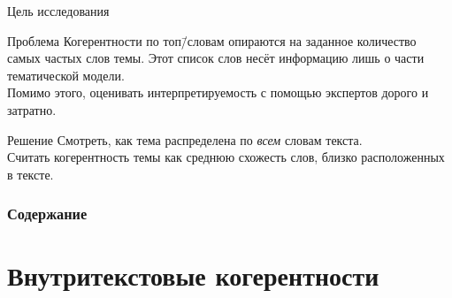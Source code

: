 \documentclass[russian]{beamer}
\begin{document}
\begin{frame}{Цель исследования}
  \begin{block}{Проблема}
    Когерентности по топ\=/словам опираются на заданное количество самых частых слов темы.
    Этот список слов несёт информацию лишь о части тематической модели.\\
    Помимо этого, оценивать интерпретируемость с помощью экспертов дорого и затратно.
  \end{block}
  \begin{block}{Решение}
    Смотреть, как тема распределена по \emph{всем} словам текста.\\
    Считать когерентность темы как среднюю схожесть слов, близко расположенных в тексте.
  \end{block}
\end{frame}


\begin{frame}
  \frametitle{Содержание}
  \tableofcontents
\end{frame}


%  
%  



\section{Внутритекстовые когерентности}
\end{document}

